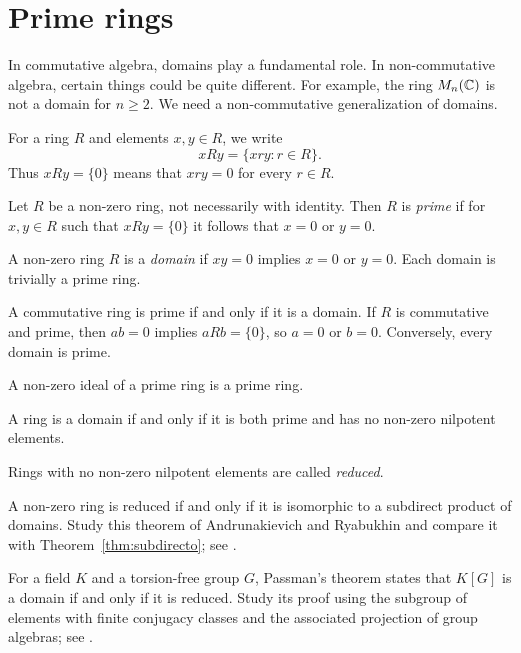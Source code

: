 \section{Prime rings}

In commutative algebra, domains play a fundamental role. In non-commutative
algebra, certain things could be quite different. 
For example, the ring $M_n(\mathbb{C})$ is not a domain for $n\geq2$.
We need a non-commutative generalization of domains.

For a ring $R$ and elements $x,y\in R$, we write
\[
    xRy=\{xry:r\in R\}.
\]
Thus $xRy=\{0\}$ means that $xry=0$ for every $r\in R$.

\begin{definition}
	Let $R$ be a non-zero ring, not necessarily with identity. Then $R$ is
	\emph{prime} if for $x,y\in R$ such that $xRy=\{0\}$ it follows that $x=0$ or 
	$y=0$.
\end{definition}

A non-zero ring $R$ is a \emph{domain} if $xy=0$ implies
$x=0$ or $y=0$. Each domain is trivially a prime ring.

\begin{example}
    A commutative ring is prime if and only if it is a domain. If $R$ is commutative and prime, 
	then $ab=0$ implies $aRb=\{0\}$, so $a=0$ or $b=0$. Conversely, every domain is prime. 
\end{example}

\begin{example}
    A non-zero ideal of a prime ring is a prime ring.
\end{example}

\begin{exercise}
\label{xca:domain<=>prime+reduced}
    A ring is a domain if and only if
    it is both prime and has no non-zero nilpotent elements. 
\end{exercise}

Rings with no non-zero nilpotent elements are called \emph{reduced}.

\smallskip 
\project
A non-zero ring is reduced if and only if it is isomorphic
to a subdirect product of domains. Study this theorem
of Andrunakievich and Ryabukhin and compare it with
Theorem~\ref{thm:subdirecto};
see \cite[Theorem~3.20.5]{MR2015465}.

\smallskip 
\project
For a field $K$ and a torsion-free group $G$, Passman's theorem
states that $K[G]$ is a domain if and only if it is reduced.
Study its proof using the subgroup of elements with finite
conjugacy classes and the associated projection of group
algebras; see \cite{MR798076}.



